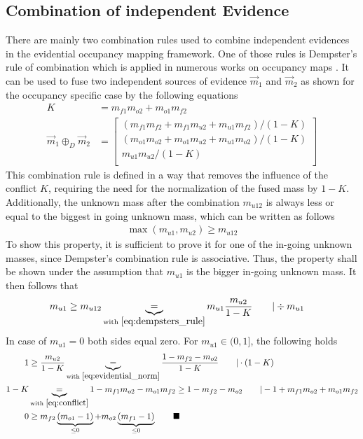 \subsection{Combination of independent Evidence}
\label{subsec:combination_of_independent_evidence}
There are mainly two combination rules used to combine independent evidences in the evidential occupancy mapping framework. One of those rules is Dempster's rule of combination \cite{dempster1968generalization} which is applied in numerous works on occupancy maps \cite{pagac1996evidential,yu2015evidential,moras2011moving,mouhagir2017using}. It can be used to fuse two independent sources of evidence $\vec{m}_1$ and $\vec{m}_2$ as shown for the occupancy specific case by the following equations
\begin{align}
	\label{eq:conflict}
	K &= m_{f1}m_{o2}+m_{o1}m_{f2}\\
	\label{eq:dempsters_rule}
	\vec{m}_1 \oplus_D \vec{m}_2 &=  
	\begin{bmatrix} 
		(m_{f1}m_{f2} + m_{f1}m_{u2} + m_{u1}m_{f2}) / (1-K)\\
		(m_{o1}m_{o2} + m_{o1}m_{u2} + m_{u1}m_{o2}) / (1-K)\\
		m_{u1}m_{u2}/(1-K)\\
	\end{bmatrix}
\end{align}
This combination rule is defined in a way that removes the influence of the conflict $K$, requiring the need for the normalization of the fused mass by $1-K$. Additionally, the unknown mass after the combination $m_{u12}$ is always less or equal to the biggest in going unknown mass, which can be written as follows
\begin{align}
	\max(m_{u1}, m_{u2}) \geq m_{u12} 
\end{align}
To show this property, it is sufficient to prove it for one of the in-going unknown masses, since Dempster's combination rule is associative. Thus, the property shall be shown under the assumption that $m_{u1}$ is the bigger in-going unknown mass. It then follows that
\begin{align}
	m_{u1} &\geq m_{u12} \underbrace{=}_{\text{with } \eqref{eq:dempsters_rule}} m_{u1}\dfrac{m_{u2}}{1-K} \qquad| \div m_{u1}
\end{align}
In case of $m_{u1} = 0$ both sides equal zero. For $m_{u1} \in (0,1]$, the following holds
\begin{align}
	1 &\geq \dfrac{m_{u2}}{1-K} \underbrace{=}_{\text{with }\eqref{eq:evidential_norm}} \dfrac{1-m_{f2}-m_{o2}}{1-K} \qquad|\cdot (1-K)\\
	1 - K &\underbrace{=}_{\text{with }\eqref{eq:conflict}} 1-m_{f1}m_{o2}-m_{o1}m_{f2} \geq 1-m_{f2}-m_{o2} \qquad| -1+m_{f1}m_{o2}+m_{o1}m_{f2}\\
	0 &\geq m_{f2}\underbrace{(m_{o1}-1)}_{\leq 0} + m_{o2}\underbrace{(m_{f1}-1)}_{\leq 0} \qquad\blacksquare
\end{align}
